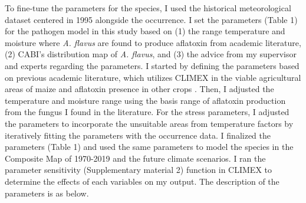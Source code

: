 \pagebreak
To fine-tune the parameters for the species, I used the historical meteorological dataset centered in 1995 alongside the  occurrence. I set the parameters (Table 1) for the pathogen model in this study based on (1) the range temperature and moisture where \textit{A. flavus} are found to produce aflatoxin from academic literature, (2) CABI's distribution map of \textit{A. flavus}, and (3) the advice from my supervisor and experts regarding the parameters. I started by defining the parameters based on previous academic literature, which utilizes CLIMEX in the viable agricultural areas of maize \citep{ramirez2017global} and aflatoxin presence in other crops \citep{haerani2020climate}. Then, I adjusted the temperature and moisture range using the basis range of aflatoxin production from the fungus I found in the literature. For the stress parameters, I adjusted the parameters to incorporate the unsuitable areas from temperature factors by iteratively fitting the parameters with the  occurrence data. I finalized the parameters (Table 1) and used the same parameters to model the species in the Composite Map of 1970-2019 and the future climate scenarios. I ran the parameter sensitivity (Supplementary material 2) function in CLIMEX to determine the effects of each variables on my output. The description of the parameters is as below. 

